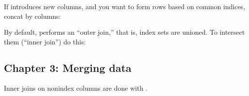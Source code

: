 \documentclass[letterpaper,10pt,english]{jupyterBook}
\begin{document}
\sphinxAtStartPar
If  introduces new columns, and you want to form rows based on common indices, concat by columns:

\begin{sphinxVerbatim}[commandchars=\\\{\}]
   \PYG{p}{[}   \PYG{p}{]}  
   \PYG{p}{[}   \PYG{p}{]}  
\end{sphinxVerbatim}

\sphinxAtStartPar
By default,  performs an “outer join,” that is, index sets are unioned.  To intersect them (“inner join”) do this:

\begin{sphinxVerbatim}[commandchars=\\\{\}]
   \PYG{p}{[}   \PYG{p}{]} 
                     
     
\end{sphinxVerbatim}


\subsection{Chapter 3: Merging data}
\label{\detokenize{big-cheat-sheet:chapter-3-merging-data}}
\sphinxAtStartPar
Inner joins on non\sphinxhyphen{}index columns are done with .
\end{document}
